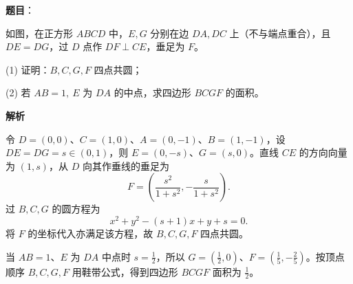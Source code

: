\begin{answer}

\textbf{题目}：

如图，在正方形 \(ABCD\) 中，\(E,G\) 分别在边 \(DA,DC\) 上（不与端点重合），且 \(DE=DG\)，过 \(D\) 点作 \(DF\perp CE\)，垂足为 \(F\)。
\nopagebreak[4]
\begin{center}\end{center}
\nopagebreak[4]
   (1) 证明：\(B,C,G,F\) 四点共圆；

   (2) 若 \(AB=1,\ E\) 为 \(DA\) 的中点，求四边形 \(BCGF\) 的面积。

\textbf{解析}


令 \(D=(0,0)\)、\(C=(1,0)\)、\(A=(0,-1)\)、\(B=(1,-1)\)，设 \(DE=DG=s\in(0,1)\)，则 \(E=(0,-s)\)、\(G=(s,0)\)。直线 \(CE\) 的方向向量为 \((1,s)\)，从 \(D\) 向其作垂线的垂足为
\nopagebreak[4]
\[
F=\left(\frac{s^2}{1+s^2},-\frac{s}{1+s^2}\right).
\]
过 \(B,C,G\) 的圆方程为
\nopagebreak[4]
\[
x^2+y^2-(s+1)x+y+s=0.
\]
将 \(F\) 的坐标代入亦满足该方程，故 \(B,C,G,F\) 四点共圆。


当 \(AB=1\)、\(E\) 为 \(DA\) 中点时 \(s=\frac12\)，所以 \(G=(\frac12,0)\)、\(F=(\frac15,-\frac25)\)。按顶点顺序 \(B,C,G,F\) 用鞋带公式，得到四边形 \(BCGF\) 面积为 \(\frac12\)。



\end{answer}
